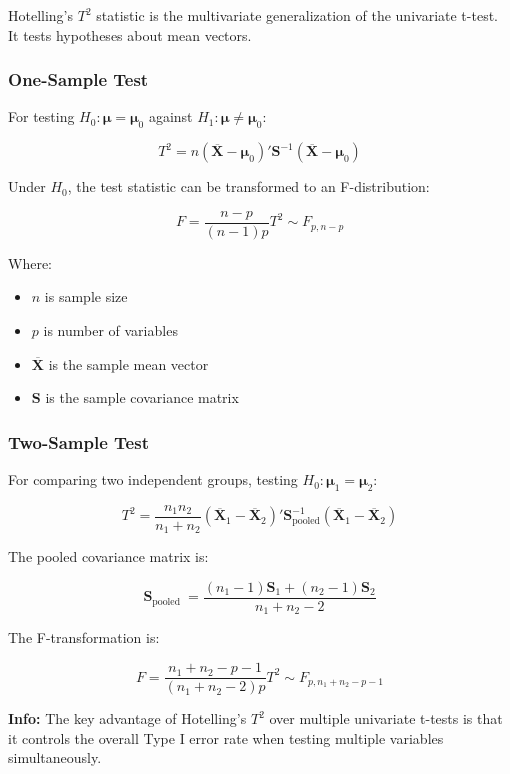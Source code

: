\documentclass[
]{article}
\begin{document}
Hotelling's \(T^{2}\) statistic is the multivariate generalization of
the univariate t-test. It tests hypotheses about mean vectors.

\subsubsection{One-Sample Test}

For testing \(H_{0}:\mathbf{\mu} = \mathbf{\mu}_{0}\) against
\(H_{1}:\mathbf{\mu} \neq \mathbf{\mu}_{0}\):

\[T^{2} = n\left( \overline{\mathbf{X}} - \mathbf{\mu}_{0} \right)'\mathbf{S}^{- 1}\left( \overline{\mathbf{X}} - \mathbf{\mu}_{0} \right)\]

Under \(H_{0}\), the test statistic can be transformed to an
F-distribution:

\[F = \frac{n - p}{(n - 1)p}T^{2} \sim F_{p,n - p}\]

Where:

\begin{itemize}
\item
  \(n\) is sample size
\item
  \(p\) is number of variables
\item
  \(\overline{\mathbf{X}}\) is the sample mean vector
\item
  \(\mathbf{S}\) is the sample covariance matrix
\end{itemize}

\subsubsection{Two-Sample Test}

For comparing two independent groups, testing
\(H_{0}:\mathbf{\mu}_{1} = \mathbf{\mu}_{2}\):

\[T^{2} = \frac{n_{1}n_{2}}{n_{1} + n_{2}}\left( {\overline{\mathbf{X}}}_{1} - {\overline{\mathbf{X}}}_{2} \right)'\mathbf{S}_{\text{pooled}}^{- 1}\left( {\overline{\mathbf{X}}}_{1} - {\overline{\mathbf{X}}}_{2} \right)\]

The pooled covariance matrix is:

\[\mathbf{S}_{\text{pooled }} = \frac{\left( n_{1} - 1 \right)\mathbf{S}_{1} + \left( n_{2} - 1 \right)\mathbf{S}_{2}}{n_{1} + n_{2} - 2}\]

The F-transformation is:

\[F = \frac{n_{1} + n_{2} - p - 1}{\left( n_{1} + n_{2} - 2 \right)p}T^{2} \sim F_{p,n_{1} + n_{2} - p - 1}\]

\textbf{Info: } The key advantage of Hotelling's \(T^{2}\) over multiple
univariate t-tests is that it controls the overall Type I error rate
when testing multiple variables simultaneously.
\end{document}
